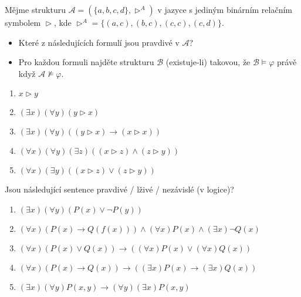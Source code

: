 \documentclass[a4paper,12pt]{article}
\begin{document}
    
\medskip\begin{problem}
    Mějme strukturu $\mathcal{A}=(\{a,b,c,d\},\vartriangleright^{A})$ v jazyce s jediným binárním relačním symbolem $\vartriangleright$, kde $\vartriangleright^{A}=\{(a,c), (b,c), (c,c), (c,d)\}$. 
    \begin{itemize}
        \item Které z následujících formulí jsou pravdivé v $\mathcal A$? 
        \item Pro každou formuli najděte strukturu $\mathcal{B}$ (existuje-li) takovou, že $\mathcal{B}\models \varphi$ právě když $\mathcal{A}\not\models \varphi$.
    \end{itemize}    
    \begin{enumerate}
       \item $x \vartriangleright y$
       \item $(\exists x)(\forall y)(y \vartriangleright x)$
       \item $(\exists x)(\forall y)((y \vartriangleright x) \to (x \vartriangleright x))$
       \item $(\forall x)(\forall y)(\exists z)((x \vartriangleright z)\wedge(z \vartriangleright y))$
       \item $(\forall x)(\exists y)((x \vartriangleright z)\vee(z \vartriangleright y))$
    \end{enumerate}
\end{problem}
    
    
\medskip\begin{problem}
    Jsou následující sentence pravdivé / lživé / nezávislé (v logice)?
    \begin{enumerate}
     \item $(\exists x)(\forall y)(P(x) \vee \neg P(y))$
    \item $(\forall x)(P(x)\to Q(f(x))) \wedge (\forall x)P(x) \wedge (\exists x)\neg Q(x)$
      \item $(\forall x)(P(x) \vee Q(x)) \to ((\forall x)P(x) \vee (\forall x)Q(x))$
       \item $(\forall x)(P(x)\to Q(x)) \to ((\exists x)P(x)\to(\exists x)Q(x))$
    \item $(\exists x)(\forall y)P(x,y) \to (\forall y)(\exists x)P(x,y)$
    \end{enumerate}
\end{problem}
    
\end{document}
